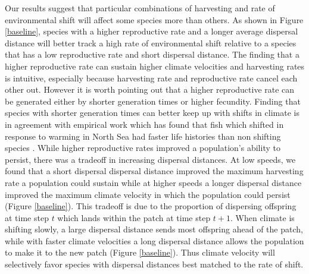 \documentclass[12pt,english]{article}
\begin{document}
\begin{spacing}{1.9}
\begin{flushleft}
Our results suggest that particular combinations of harvesting and rate of environmental shift will affect some species more than others. As shown in Figure \ref{baseline}, species with a higher reproductive rate and a longer average dispersal distance will better track a high rate of environmental shift relative to a species that has a low reproductive rate and short dispersal distance. The finding that a higher reproductive rate can sustain higher climate velocities and harvesting rates is intuitive, especially because harvesting rate and reproductive rate cancel each other out. However it is worth pointing out that a higher reproductive rate can be generated either by shorter generation times or higher fecundity. Finding that species with shorter generation times can better keep up with shifts in climate is in agreement with empirical work which has found that fish which shifted in response to warming in North Sea had faster life histories than non shifting species \citep{Perryetal2005}. While higher reproductive rates improved a population's ability to persist, there was a tradeoff in increasing dispersal distances. At low speeds, we found that a short dispersal dispersal distance improved the maximum harvesting rate a population could sustain while at higher speeds a longer dispersal distance improved the maximum climate velocity in which the population could persist (Figure \ref{baseline}). This tradeoff is due to the proportion of dispersing  offspring at time step $t$ which lands within the patch at time step $t + 1$. When climate is shifting slowly, a large dispersal distance sends most offspring ahead of the patch, while with faster climate velocities a long dispersal distance allows the population to make it to the new patch (Figure \ref{baseline}). Thus climate velocity will selectively favor species with dispersal distances best matched to the rate of shift. 


\end{flushleft}
\end{spacing}
\end{document}
